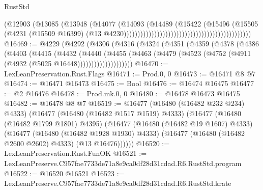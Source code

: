 \begin{lexlean}{RustStd}
\begin{coremodule}
                                                                          (@12903
                                                                            (@13085
                                                                              (@13948
                                                                                (@14077
                                                                                  (@14093
                                                                                    (@14489
                                                                                      (@15422
                                                                                        (@15496
                                                                                          (@15505
                                                                                            (@4231
                                                                                              (@15509
                                                                                                @16399)
                                                                                              (@13
                                                                                                @4230))))))))))))))))))))))))))))))))))))))))))))))
@16469 := @4229
    (@4292
      (@4306
        (@4316
          (@4324
            (@4351
              (@4359
                (@4378
                  (@4386
                    (@4403
                      (@4415
                        (@4432
                          (@4440
                            (@4455
                              (@4463
                                (@4479 (@4523 (@4752 (@4911 (@4932 (@5025 @16448))))))))))))))))))))
@16470 := LexLeanPreservation.Rust.Flags
@16471 := Prod.{0, 0}
@16473 := @16471 @8 @7
@16474 := @16471 @16473
@16475 := Bool
@16476 := @16474 @16475
@16477 := @2 @16476
@16478 := Prod.mk.{0, 0}
@16480 := @16478 @16473 @16475
@16482 := @16478 @8 @7
@16519 := @16477
    (@16480 (@16482 @232 @234) @4333)
    (@16477
      (@16480 (@16482 @1517 @1519) @4333)
      (@16477
        (@16480 (@16482 @1799 @1801) @4395)
        (@16477
          (@16480 (@16482 @19 @1607) @4333)
          (@16477
            (@16480 (@16482 @1928 @1930) @4333)
            (@16477 (@16480 (@16482 @2600 @2602) @4333) (@13 @16476))))))
@16520 := LexLeanPreservation.Rust.FunOK
@16521 := LexLeanPreserve.C957fae7733de71a8e9ca0df28d31cdad.R6.RustStd.program
@16522 := @16520 @16521
@16523 := LexLeanPreserve.C957fae7733de71a8e9ca0df28d31cdad.R6.RustStd.krate

\end{coremodule}
\end{lexlean}
